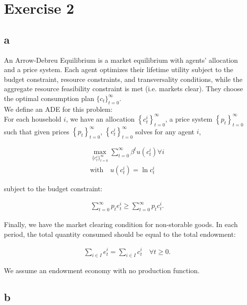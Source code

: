 \documentclass{article}
\begin{document}
\section{Exercise 2}

\subsection{a}

An Arrow-Debreu Equilibrium is a market equilibrium with agents' allocation and a price system. Each agent optimizes their lifetime utility subject to the budget constraint, resource constraints, and transversality conditions,  while the aggregate resource feasibility constraint is met (i.e. markets clear). They choose the optimal consumption plan $\{c_t \}^{\infty}_{t=0}$. \\

We define an ADE for this problem:\\

For each household $i$, we have an allocation $\left\{ c^{i}_{t}\right\}^{\infty }_{t=0}  $, a price system $\left\{ p_{t}\right\}^{\infty }_{t=0}  $ such that given prices $\left\{ p_{t}\right\}^{\infty }_{t=0}  $, $\left\{ c^{i}_{t}\right\}^{\infty }_{t=0}  $ solves for any agent $i$,

\begin{gather*}
    \max_{\{c^{i}_{t}\}^{\infty}_{t=0}} \sum^{\infty }_{t=0} \beta^{t} u\left( c^{i}_{t}\right) \forall i\\
    \mbox{with}\quad u(c_t^i)=\ln c_t^i
\end{gather*}

subject to the budget constraint:

\begin{gather*}
    \sum^{\infty }_{t=0} p_{t}e^{i}_{t} \geq \sum^{\infty }_{t=0} p_{t}c^{i}_{t}.
\end{gather*}

Finally, we have the market clearing condition for non-storable goods. In each period, the total quantity consumed should be equal to the total endowment: 

\begin{gather*}
    \sum_{i\in I} e^{i}_{t}=\sum_{i\in I} c^{i}_{t} \quad \forall t\geq 0.
\end{gather*}

We assume an endowment economy with no production function. \\

\subsection{b}
\end{document}
